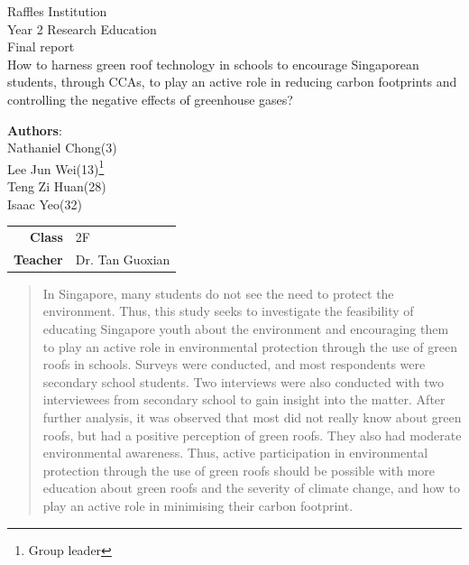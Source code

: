 \documentclass{article}
\begin{document}
\begin{titlepage}
  \begin{center}
    \Large{Raffles Institution \\ Year 2 Research Education \\ Final report} \\
    \vspace{1cm}
    \huge{How to harness green roof technology in schools to encourage
      Singaporean students, through CCAs, to play an active role in reducing
      carbon footprints and controlling the negative effects of greenhouse
      gases?
    } \\
    \vspace{1cm}
    \large{
      \textbf{Authors}: \\
      Nathaniel Chong(3) \\
      Lee Jun Wei(13)\footnote{Group leader} \\
      Teng Zi Huan(28) \\
      Isaac Yeo(32) \\
      \vspace{1cm}
      \begin{tabular}{r@{:}l}
        \textbf{Class} & \hspace{1cm} 2F \\
        \textbf{Teacher} & \hspace{1cm} Dr. Tan Guoxian \\
      \end{tabular}
    }
  \end{center}
\end{titlepage}

\newpage

\begin{abstract}
  \noindent
  In Singapore, many students do not see the need to protect the
  environment. Thus, this study seeks to investigate the feasibility of
  educating Singapore youth about the environment and encouraging them
  to play an active role in environmental protection through the use of
  green roofs in schools. Surveys were conducted, and most respondents
  were secondary school students. Two interviews were also conducted
  with two interviewees from secondary school to gain insight into
  the matter. After further analysis, it was observed that most did
  not really know about green roofs, but had a positive perception of
  green roofs. They also had moderate environmental awareness. Thus,
  active participation in environmental protection through the use
  of green roofs should be possible with more education about green
  roofs and the severity of climate change, and how to play an active
  role in minimising their carbon footprint.
\end{abstract}
\end{document}
